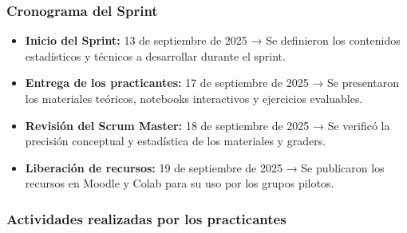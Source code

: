 \documentclass[letter,oneside,12pt,spanish]{report}
\begin{document}
\subsubsection*{Cronograma del Sprint}
\begin{itemize}
	\item \textbf{Inicio del Sprint:} 13 de septiembre de 2025 → Se definieron los contenidos estadísticos y técnicos a desarrollar durante el sprint.
	\item \textbf{Entrega de los practicantes:} 17 de septiembre de 2025 → Se presentaron los materiales teóricos, notebooks interactivos y ejercicios evaluables.
	\item \textbf{Revisión del Scrum Master:} 18 de septiembre de 2025 → Se verificó la precisión conceptual y estadística de los materiales y graders.
	\item \textbf{Liberación de recursos:} 19 de septiembre de 2025 → Se publicaron los recursos en Moodle y Colab para su uso por los grupos pilotos.
\end{itemize}

\subsubsection*{Actividades realizadas por los practicantes}
\end{document}

